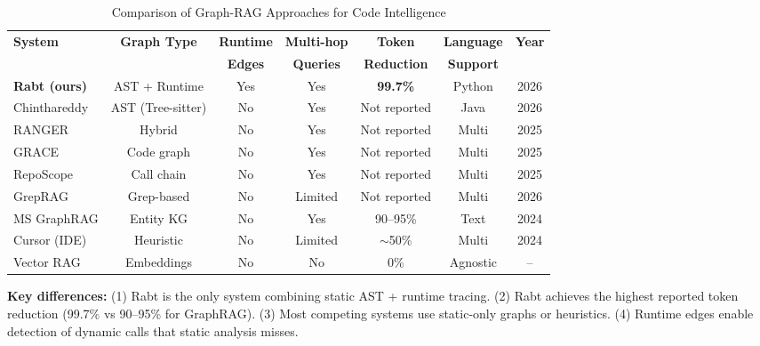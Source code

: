
\begin{table}[t]
\centering
\caption{Comparison of Graph-RAG Approaches for Code Intelligence}
\label{tab:comparison}
\small
\begin{tabular}{@{}lcccccc@{}}
\toprule
\textbf{System} & \textbf{Graph Type} & \textbf{Runtime} & \textbf{Multi-hop} & \textbf{Token} & \textbf{Language} & \textbf{Year} \\
 & & \textbf{Edges} & \textbf{Queries} & \textbf{Reduction} & \textbf{Support} & \\
\midrule
\textbf{Rabt (ours)} & AST + Runtime & Yes & Yes & \textbf{99.7\%} & Python & 2026 \\
Chinthareddy & AST (Tree-sitter) & No & Yes & Not reported & Java & 2026 \\
RANGER & Hybrid & No & Yes & Not reported & Multi & 2025 \\
GRACE & Code graph & No & Yes & Not reported & Multi & 2025 \\
RepoScope & Call chain & No & Yes & Not reported & Multi & 2025 \\
GrepRAG & Grep-based & No & Limited & Not reported & Multi & 2026 \\
MS GraphRAG & Entity KG & No & Yes & 90--95\% & Text & 2024 \\
Cursor (IDE) & Heuristic & No & Limited & $\sim$50\% & Multi & 2024 \\
Vector RAG & Embeddings & No & No & 0\% & Agnostic & -- \\
\bottomrule
\end{tabular}
\vspace{0.5em}
\begin{flushleft}
\footnotesize
\textbf{Key differences:} (1) Rabt is the only system combining static AST + runtime tracing.
(2) Rabt achieves the highest reported token reduction (99.7\% vs 90--95\% for GraphRAG).
(3) Most competing systems use static-only graphs or heuristics.
(4) Runtime edges enable detection of dynamic calls that static analysis misses.
\end{flushleft}
\end{table}
